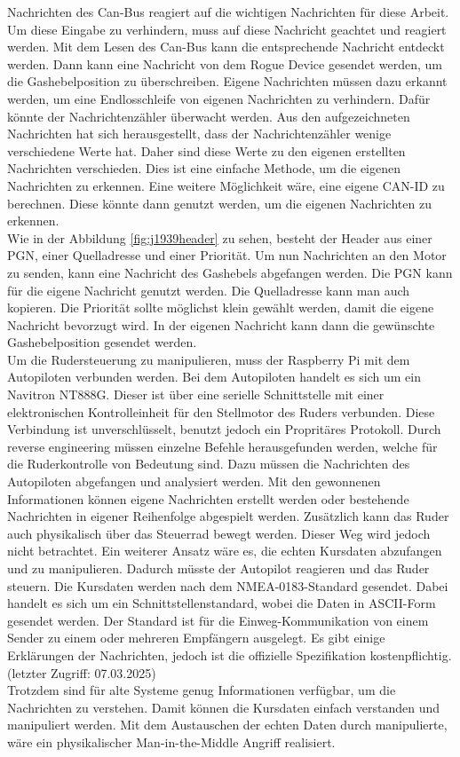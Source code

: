 Nachrichten des Can-Bus reagiert auf die wichtigen Nachrichten für diese Arbeit.
Um diese Eingabe zu verhindern, muss auf diese Nachricht geachtet und reagiert werden. Mit dem Lesen des Can-Bus kann die 
entsprechende Nachricht entdeckt werden. Dann kann eine Nachricht von dem Rogue Device gesendet werden, um die Gashebelposition
zu überschreiben. Eigene Nachrichten müssen dazu erkannt werden, um eine Endlosschleife von eigenen Nachrichten zu verhindern. Dafür könnte
der Nachrichtenzähler überwacht werden. Aus den aufgezeichneten Nachrichten hat sich herausgestellt, dass der 
Nachrichtenzähler wenige verschiedene Werte hat. Daher sind diese Werte zu den eigenen erstellten Nachrichten 
verschieden. Dies ist eine einfache Methode, um die eigenen Nachrichten zu erkennen. Eine weitere Möglichkeit wäre,
eine eigene CAN-ID zu berechnen. Diese könnte dann genutzt werden, um die eigenen Nachrichten zu erkennen.\\
Wie in der Abbildung \ref{fig:j1939header} zu sehen, besteht der Header aus einer PGN, einer Quelladresse und einer Priorität. Um nun Nachrichten
an den Motor zu senden, kann eine Nachricht des Gashebels abgefangen werden. Die PGN kann für die eigene Nachricht genutzt
werden. Die Quelladresse kann man auch kopieren. Die Priorität sollte möglichst klein gewählt werden, 
damit die eigene Nachricht bevorzugt wird. In der eigenen Nachricht kann dann die gewünschte Gashebelposition gesendet werden.
\\
Um die Rudersteuerung zu manipulieren, muss der Raspberry Pi mit dem Autopiloten verbunden werden. Bei dem Autopiloten
handelt es sich um ein Navitron NT888G. Dieser ist über eine serielle Schnittstelle mit einer elektronischen Kontrolleinheit
für den Stellmotor des Ruders verbunden. Diese Verbindung ist unverschlüsselt, benutzt jedoch ein Propritäres Protokoll.
Durch reverse engineering müssen einzelne Befehle herausgefunden werden, welche für die Ruderkontrolle von Bedeutung sind.
Dazu müssen die Nachrichten des Autopiloten abgefangen und analysiert werden. Mit den gewonnenen Informationen können
eigene Nachrichten erstellt werden oder bestehende Nachrichten in eigener Reihenfolge abgespielt werden.
Zusätzlich kann das Ruder auch physikalisch über das Steuerrad bewegt werden. Dieser Weg wird jedoch nicht betrachtet.
Ein weiterer Ansatz wäre es, die echten Kursdaten abzufangen und zu manipulieren. Dadurch müsste der Autopilot reagieren
und das Ruder steuern. Die Kursdaten werden nach dem NMEA-0183-Standard gesendet. Dabei handelt es sich um ein Schnittstellenstandard, 
wobei die Daten in ASCII-Form gesendet werden. Der Standard ist für die Einweg-Kommunikation von einem Sender zu einem oder mehreren
Empfängern ausgelegt. Es gibt einige Erklärungen der Nachrichten, jedoch ist die offizielle Spezifikation kostenpflichtig. 
\cite{nmea0183} (letzter Zugriff: 07.03.2025)\\
Trotzdem sind für alte Systeme genug Informationen verfügbar, um die Nachrichten zu verstehen. Damit können die Kursdaten
einfach verstanden und manipuliert werden. Mit dem Austauschen der echten Daten durch manipulierte, wäre ein 
physikalischer Man-in-the-Middle Angriff realisiert.\\

